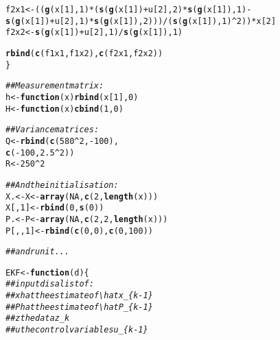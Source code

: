 \documentclass[11pt]{article}\usepackage[]{graphicx}\usepackage[]{color}
\makeatletter
\newcommand{\hlnum}[1]{\textcolor[rgb]{0.686,0.059,0.569}{#1}}%
\newcommand{\hlcom}[1]{\textcolor[rgb]{0.678,0.584,0.686}{\textit{#1}}}%
\newcommand{\hlopt}[1]{\textcolor[rgb]{0,0,0}{#1}}%
\newcommand{\hlstd}[1]{\textcolor[rgb]{0.345,0.345,0.345}{#1}}%
\newcommand{\hlkwa}[1]{\textcolor[rgb]{0.161,0.373,0.58}{\textbf{#1}}}%
\newcommand{\hlkwb}[1]{\textcolor[rgb]{0.69,0.353,0.396}{#1}}%
\newcommand{\hlkwc}[1]{\textcolor[rgb]{0.333,0.667,0.333}{#1}}%
\newcommand{\hlkwd}[1]{\textcolor[rgb]{0.737,0.353,0.396}{\textbf{#1}}}%
\newenvironment{kframe}{%
 \def\at@end@of@kframe{}%
 \ifinner\ifhmode%
  \def\at@end@of@kframe{\end{minipage}}%
  \begin{minipage}{\columnwidth}%
 \fi\fi%
 \def\FrameCommand##1{\hskip\@totalleftmargin \hskip-\fboxsep
 \colorbox{shadecolor}{##1}\hskip-\fboxsep
     \hskip-\linewidth \hskip-\@totalleftmargin \hskip\columnwidth}%
 \MakeFramed {\advance\hsize-\width
   \@totalleftmargin\z@ \linewidth\hsize
   \@setminipage}}%
 {\par\unskip\endMakeFramed%
 \at@end@of@kframe}
\newenvironment{knitrout}{}{} %
\makeatother
\begin{document}
\begin{knitrout}
\begin{kframe}
\begin{alltt}
    \hlstd{f2x1} \hlkwb{<-} \hlstd{((}\hlkwd{g}\hlstd{(x[}\hlnum{1}\hlstd{],} \hlnum{1}\hlstd{)} \hlopt{*} \hlstd{(}\hlkwd{s}\hlstd{(}\hlkwd{g}\hlstd{(x[}\hlnum{1}\hlstd{])} \hlopt{+} \hlstd{u[}\hlnum{2}\hlstd{],} \hlnum{2}\hlstd{)} \hlopt{*} \hlkwd{s}\hlstd{(}\hlkwd{g}\hlstd{(x[}\hlnum{1}\hlstd{]),} \hlnum{1}\hlstd{)} \hlopt{-} \hlkwd{s}\hlstd{(}\hlkwd{g}\hlstd{(x[}\hlnum{1}\hlstd{])} \hlopt{+} \hlstd{u[}\hlnum{2}\hlstd{],} \hlnum{1}\hlstd{)} \hlopt{*} \hlkwd{s}\hlstd{(}\hlkwd{g}\hlstd{(x[}\hlnum{1}\hlstd{]),} \hlnum{2}\hlstd{)))} \hlopt{/} \hlstd{(}\hlkwd{s}\hlstd{(}\hlkwd{g}\hlstd{(x[}\hlnum{1}\hlstd{]),} \hlnum{1}\hlstd{)}\hlopt{^}\hlnum{2}\hlstd{))} \hlopt{*} \hlstd{x[}\hlnum{2}\hlstd{]}
    \hlstd{f2x2} \hlkwb{<-} \hlkwd{s}\hlstd{(}\hlkwd{g}\hlstd{(x[}\hlnum{1}\hlstd{])} \hlopt{+} \hlstd{u[}\hlnum{2}\hlstd{],} \hlnum{1}\hlstd{)} \hlopt{/} \hlkwd{s}\hlstd{(}\hlkwd{g}\hlstd{(x[}\hlnum{1}\hlstd{]),} \hlnum{1}\hlstd{)}

    \hlkwd{rbind}\hlstd{(}\hlkwd{c}\hlstd{(f1x1, f1x2),} \hlkwd{c}\hlstd{(f2x1, f2x2))}
\hlstd{\}}

\hlcom{## Measurement matrix:}
\hlstd{h} \hlkwb{<-} \hlkwa{function}\hlstd{(}\hlkwc{x}\hlstd{)} \hlkwd{rbind}\hlstd{(x[}\hlnum{1}\hlstd{],} \hlnum{0}\hlstd{)}
\hlstd{H} \hlkwb{<-} \hlkwa{function}\hlstd{(}\hlkwc{x}\hlstd{)} \hlkwd{cbind}\hlstd{(}\hlnum{1}\hlstd{,} \hlnum{0}\hlstd{)}

\hlcom{## Variance matrices:}
\hlstd{Q} \hlkwb{<-} \hlkwd{rbind}\hlstd{(}\hlkwd{c}\hlstd{(}\hlnum{580}\hlopt{^}\hlnum{2}\hlstd{,} \hlopt{-}\hlnum{100}\hlstd{),}
           \hlkwd{c}\hlstd{(}\hlopt{-}\hlnum{100}\hlstd{,} \hlnum{2.5}\hlopt{^}\hlnum{2}\hlstd{))}
\hlstd{R} \hlkwb{<-} \hlnum{250}\hlopt{^}\hlnum{2}

\hlcom{## And the initialisation:}
\hlstd{X.} \hlkwb{<-} \hlstd{X} \hlkwb{<-} \hlkwd{array}\hlstd{(}\hlnum{NA}\hlstd{,} \hlkwd{c}\hlstd{(}\hlnum{2}\hlstd{,} \hlkwd{length}\hlstd{(x)))}
\hlstd{X[,} \hlnum{1}\hlstd{]} \hlkwb{<-} \hlkwd{rbind}\hlstd{(}\hlnum{0}\hlstd{,} \hlkwd{s}\hlstd{(}\hlnum{0}\hlstd{))}
\hlstd{P.} \hlkwb{<-} \hlstd{P} \hlkwb{<-} \hlkwd{array}\hlstd{(}\hlnum{NA}\hlstd{,} \hlkwd{c}\hlstd{(}\hlnum{2}\hlstd{,} \hlnum{2}\hlstd{,} \hlkwd{length}\hlstd{(x)))}
\hlstd{P[,,}\hlnum{1}\hlstd{]} \hlkwb{<-} \hlkwd{rbind}\hlstd{(}\hlkwd{c}\hlstd{(}\hlnum{0}\hlstd{,} \hlnum{0}\hlstd{),} \hlkwd{c}\hlstd{(}\hlnum{0}\hlstd{,} \hlnum{100}\hlstd{))}


\hlcom{## and run it ...}

\hlstd{EKF} \hlkwb{<-} \hlkwa{function}\hlstd{(}\hlkwc{d}\hlstd{) \{}
    \hlcom{## input d is a list of :}
    \hlcom{## xhat  the estimate of \textbackslash{}hat x_\{k-1\}}
    \hlcom{## Phat  the estimate of \textbackslash{}hat P_\{k-1\}}
    \hlcom{## z     the data z_k}
    \hlcom{## u     the control variables u_\{k-1\}}


\end{alltt}
\end{kframe}
\end{knitrout}
\end{document}
